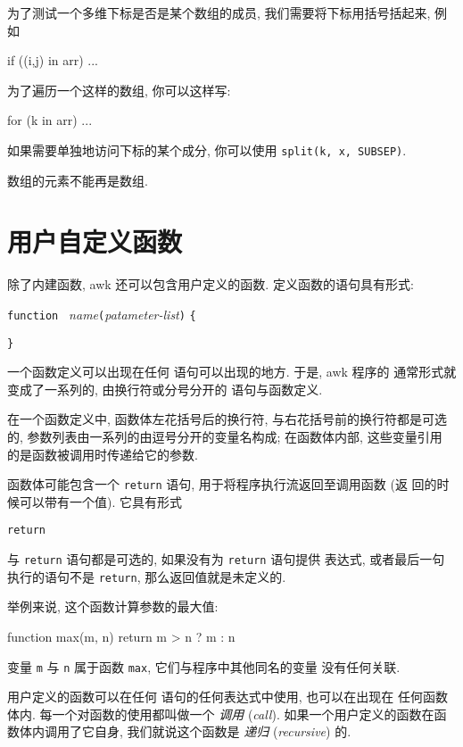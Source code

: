 为了测试一个多维下标是否是某个数组的成员, 我们需要将下标用括号括起来, 例如
\begin{myverb}
    if ((i,j) in arr) ...
\end{myverb}
为了遍历一个这样的数组, 你可以这样写:
\begin{myverb}
    for (k in arr) ...
\end{myverb}
如果需要单独地访问下标的某个成分, 你可以使用 \verb'split(k, x, SUBSEP)'.

数组的元素不能再是数组.

\section{用户自定义函数}
\label{sec:user_defined_functions}

除了内建函数, awk 还可以包含用户定义的函数. 定义函数的语句具有形式:
\begin{pattern}
    \verb'function ' \textit{name}\verb'('\textit{patameter-list}\verb')'
        \verb'{' \par
            \indent\indent\stmt \par
        \verb'}'
\end{pattern}
一个函数定义可以出现在任何 \patact 语句可以出现的地方. 于是, awk 程序的
通常形式就变成了一系列的, 由换行符或分号分开的 \patact 语句与函数定义.

在一个函数定义中, 函数体左花括号后的换行符, 与右花括号前的换行符都是可选
的, 参数列表由一系列的由逗号分开的变量名构成; 在函数体内部, 这些变量引用
的是函数被调用时传递给它的参数.

函数体可能包含一个 \verb'return' 语句, 用于将程序执行流返回至调用函数 (返
回的时候可以带有一个值). 它具有形式
\begin{pattern}
    \verb'return '\expr
\end{pattern}
\expr 与 \verb'return' 语句都是可选的, 如果没有为 \verb'return' 语句提供
表达式, 或者最后一句执行的语句不是 \verb'return', 那么返回值就是未定义的.

举例来说, 这个函数计算参数的最大值:
\begin{myverb}
    function max(m, n) {
        return m > n ? m : n
    }
\end{myverb}
变量 \verb'm' 与 \verb'n' 属于函数 \verb'max', 它们与程序中其他同名的变量
没有任何关联.

用户定义的函数可以在任何 \patact 语句的任何表达式中使用, 也可以在出现在
任何函数体内. 每一个对函数的使用都叫做一个 \emph{调用} (\emph{call}).
如果一个用户定义的函数在函数体内调用了它自身,
我们就说这个函数是 \emph{递归}
(\emph{recursive}) 的.

